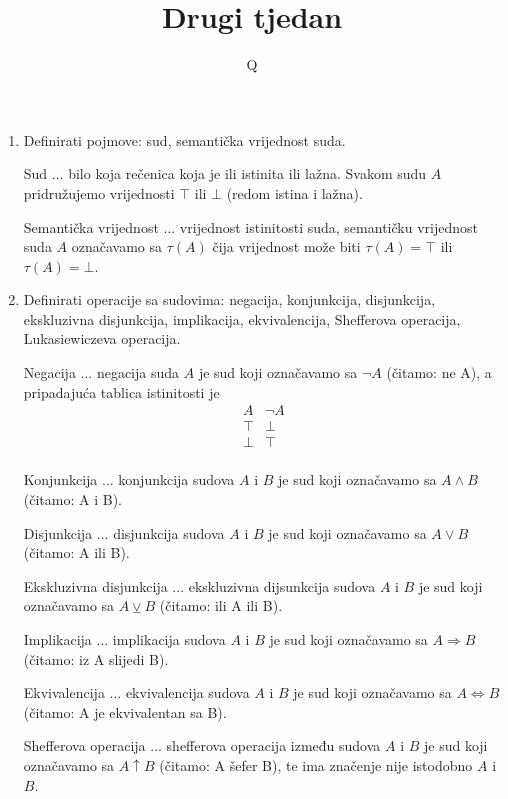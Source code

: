 \documentclass{article}
\title{\textbf{Drugi tjedan}}
\author{Q}
\date{}
\begin{document}
\pagecolor{black}
\color{white}
\maketitle

\begin{enumerate}

\item Definirati pojmove: sud, semantička vrijednost suda.

Sud ... bilo koja rečenica koja je ili istinita ili lažna. Svakom sudu $A$ pridružujemo vrijednosti $\top$ ili $\bot$ (redom istina i lažna).

Semantička vrijednost ... vrijednost istinitosti suda, semantičku vrijednost suda $A$ označavamo sa $\tau (A)$ čija vrijednost može biti $\tau (A) = \top$ ili $\tau (A) = \bot$.

\item Definirati operacije sa sudovima: negacija, konjunkcija, disjunkcija, ekskluzivna disjunkcija, implikacija, ekvivalencija, Shefferova operacija, Lukasiewiczeva operacija.

Negacija ... negacija suda $A$ je sud koji označavamo sa $\neg A$ (čitamo: ne A), a pripadajuća tablica istinitosti je
\begin{displaymath}
\begin{array}{|c|c|}
A & \neg A\\
\hline
\top & \bot\\
\bot & \top\\
\end{array}
\end{displaymath}

Konjunkcija ... konjunkcija sudova $A$ i $B$ je sud koji označavamo sa $A\land B$ (čitamo: A i B).

Disjunkcija ... disjunkcija sudova $A$ i $B$ je sud koji označavamo sa $A\lor B$ (čitamo: A ili B).

Ekskluzivna disjunkcija ... ekskluzivna dijsunkcija sudova $A$ i $B$ je sud koji označavamo sa $A\veebar B$ (čitamo: ili A ili B).

Implikacija ... implikacija sudova $A$ i $B$ je sud koji označavamo sa $A\Rightarrow B$ (čitamo: iz A slijedi B).

Ekvivalencija ... ekvivalencija sudova $A$ i $B$ je sud koji označavamo sa $A\Leftrightarrow B$ (čitamo: A je ekvivalentan sa B).

Shefferova operacija ... shefferova operacija između sudova $A$ i $B$ je sud koji označavamo sa $A\uparrow B$ (čitamo: A šefer B), te ima značenje nije istodobno $A$ i $B$.


\end{enumerate}
\end{document}
